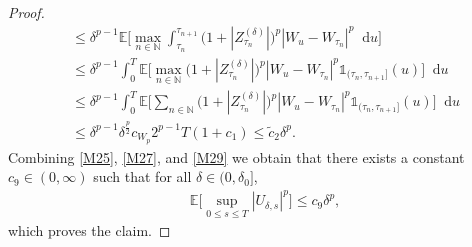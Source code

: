 \documentclass[10pt,a4paper]{amsart}
\newcommand{\E}{{\mathbb{E}}}
\newcommand{\N}{{\mathbb{N}}}
\newcommand{\diff}{\mathop{}\!\mathrm{d}}
\begin{document}
\begin{proof}
\begin{equation}
\begin{aligned}
        & \leq \delta^{p-1} \E\Big[ \max_{n\in\N} \int_{\tau_n}^{\tau_{n+1}} \big( 1 +  |Z^{(\delta)}_{\tau_n}|\big)^p|W_u-W_{\tau_n}|^p \diff u \Big]\\
        & \leq \delta^{p-1} \int_{0}^{T}\E\Big[ \max_{n\in\N}  \big( 1 +  |Z^{(\delta)}_{\tau_n}|\big)^p|W_u-W_{\tau_n}|^p \mathds{1}_{(\tau_n,\tau_{n+1}]} (u)  \Big] \diff u\\
        &\leq \delta^{p-1} \int_{0}^{T}\E\Big[ \sum_{n\in\N}  \big( 1 +  |Z^{(\delta)}_{\tau_n}|\big)^p|W_u-W_{\tau_n}|^p \mathds{1}_{(\tau_n,\tau_{n+1}]} (u)  \Big] \diff u\\
        &\leq \delta^{p-1} \delta^{\frac{p}{2}} c_{W_p} 2^{p-1} T(1+c_1)
        \leq \widetilde c_2 \delta^{p}.
        \end{aligned}
    \end{equation}
    Combining \eqref{M25}, \eqref{M27}, and \eqref{M29} we obtain that there exists a constant $ c_{9}\in(0,\infty)$ such that for all $\delta\in(0,\delta_0]$,
    \begin{equation}\label{M30}
        \begin{aligned}
        &  \E\Big[\sup_{0\leq s\leq T} |U_{\delta,s}|^p\Big]\leq  c_{9} \delta^{p},
        \end{aligned}
    \end{equation}
    which proves the claim.
\end{proof}
\end{document}
